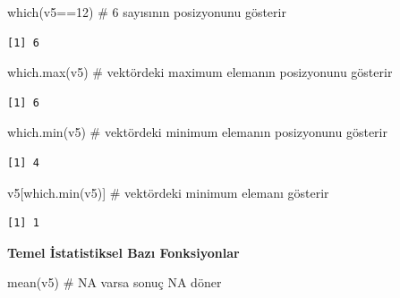 \documentclass[
  letterpaper,
  DIV=11,
  numbers=noendperiod]{scrreprt}
\newenvironment{Shaded}{\begin{snugshade}}{\end{snugshade}}
\newcommand{\CommentTok}[1]{\textcolor[rgb]{0.37,0.37,0.37}{#1}}
\newcommand{\DecValTok}[1]{\textcolor[rgb]{0.68,0.00,0.00}{#1}}
\newcommand{\FunctionTok}[1]{\textcolor[rgb]{0.28,0.35,0.67}{#1}}
\newcommand{\NormalTok}[1]{\textcolor[rgb]{0.00,0.23,0.31}{#1}}
\newcommand{\SpecialCharTok}[1]{\textcolor[rgb]{0.37,0.37,0.37}{#1}}
\begin{document}
\begin{Shaded}
\begin{Highlighting}[]
\FunctionTok{which}\NormalTok{(v5}\SpecialCharTok{==}\DecValTok{12}\NormalTok{) }\CommentTok{\# 6 sayısının posizyonunu gösterir}
\end{Highlighting}
\end{Shaded}

\begin{verbatim}
[1] 6
\end{verbatim}

\begin{Shaded}
\begin{Highlighting}[]
\FunctionTok{which.max}\NormalTok{(v5) }\CommentTok{\# vektördeki maximum elemanın posizyonunu gösterir}
\end{Highlighting}
\end{Shaded}

\begin{verbatim}
[1] 6
\end{verbatim}

\begin{Shaded}
\begin{Highlighting}[]
\FunctionTok{which.min}\NormalTok{(v5) }\CommentTok{\# vektördeki minimum elemanın posizyonunu gösterir}
\end{Highlighting}
\end{Shaded}

\begin{verbatim}
[1] 4
\end{verbatim}

\begin{Shaded}
\begin{Highlighting}[]
\NormalTok{v5[}\FunctionTok{which.min}\NormalTok{(v5)] }\CommentTok{\# vektördeki minimum elemanı gösterir}
\end{Highlighting}
\end{Shaded}

\begin{verbatim}
[1] 1
\end{verbatim}

\textbf{Temel İstatistiksel Bazı Fonksiyonlar}

\begin{Shaded}
\begin{Highlighting}[]
\FunctionTok{mean}\NormalTok{(v5) }\CommentTok{\# NA varsa sonuç NA döner}
\end{Highlighting}
\end{Shaded}
\end{document}
